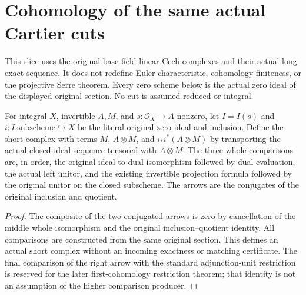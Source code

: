 \section{Cohomology of the same actual Cartier cuts}
This slice uses the original base-field-linear Cech complexes and their
actual long exact sequence. It does not redefine Euler characteristic,
cohomology finiteness, or the projective Serre theorem. Every zero scheme
below is the actual zero ideal of the displayed original section.
No cut is assumed reduced or integral.

\begin{definition}
\label{def:seshadri-original-section-cut-complex}
\leanok
For integral $X$, invertible $A,M$, and $s:\mathcal O_X\to A$ nonzero,
let $I=I(s)$ and $i:I.\mathrm{subscheme}\hookrightarrow X$ be the literal
original zero ideal and inclusion. Define the short complex with terms
$M$, $A\otimes M$, and $i_*i^*(A\otimes M)$ by transporting the actual
closed-ideal sequence tensored with $A\otimes M$. The three whole
comparisons are, in order, the original ideal-to-dual isomorphism followed
by dual evaluation, the actual left unitor, and the existing invertible
projection formula followed by the original unitor on the closed subscheme.
The arrows are the conjugates of the original inclusion and quotient.
\end{definition}
\begin{proof}
The composite of the two conjugated arrows is zero by cancellation of
the middle whole isomorphism and the original inclusion--quotient identity.
All comparisons are constructed from the same original section. This defines
an actual short complex without an incoming exactness or matching certificate.
The final comparison of the right arrow with the standard adjunction-unit
restriction is reserved for the later first-cohomology restriction theorem;
that identity is not an assumption of the higher comparison producer.
\end{proof}


